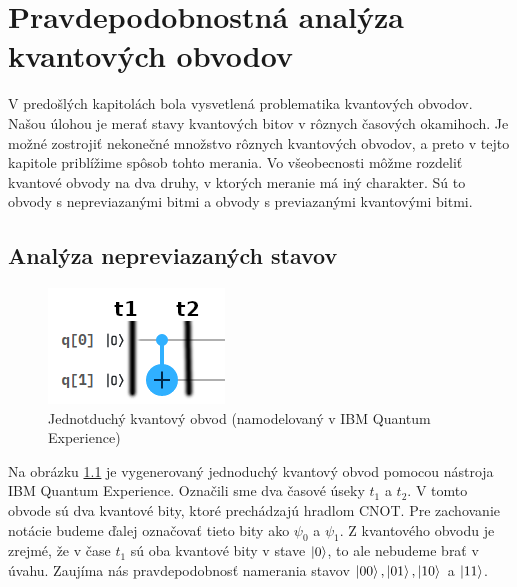 
\chapter{Pravdepodobnostná analýza kvantových obvodov}
\label{pravAnalL}

V predošlých kapitolách bola vysvetlená problematika kvantových obvodov.
Našou úlohou je merať stavy kvantových bitov v rôznych časových okamihoch.
Je možné zostrojiť nekonečné množstvo rôznych kvantových obvodov,
a preto v tejto kapitole priblížime spôsob tohto merania.
Vo všeobecnosti môžme rozdeliť kvantové obvody na dva druhy, v ktorých 
meranie má iný charakter. Sú to obvody s nepreviazanými bitmi a obvody s 
previazanými kvantovými bitmi.

\section{Analýza nepreviazaných stavov}

\begin{figure} 
	\centering 
	\includegraphics[width=.4\textwidth]{figures/simpleCircuit2.png} 
	\caption{Jednotduchý kvantový obvod (namodelovaný v IBM Quantum Experience)}
    \label{obvod}
\end{figure}

Na obrázku \ref{obvod} je vygenerovaný jednoduchý kvantový obvod pomocou
nástroja IBM Quantum Experience. Označili sme dva časové úseky 
\(t_1\) a \(t_2\). V tomto obvode sú dva kvantové bity, ktoré prechádzajú 
hradlom CNOT. Pre 
zachovanie notácie budeme ďalej označovať tieto bity ako 
\(\psi_0\) a \(\psi_1\). Z kvantového obvodu je zrejmé, že v čase \(t_1\) 
sú oba kvantové bity v stave
\(\ket{0}\), to ale nebudeme brať v úvahu. Zaujíma nás pravdepodobnosť 
namerania stavov \(\ket{00}, \ket{01}, \ket{10}\) a \(\ket{11}\).

